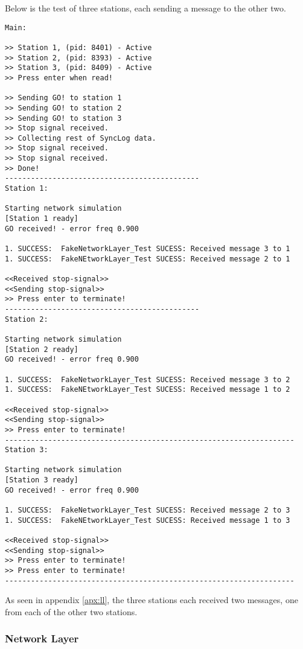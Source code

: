 Below is the test of three stations, each sending a message to the other two.
\begin{lstlisting}
Main:

>> Station 1, (pid: 8401) - Active
>> Station 2, (pid: 8393) - Active
>> Station 3, (pid: 8409) - Active
>> Press enter when read!

>> Sending GO! to station 1
>> Sending GO! to station 2
>> Sending GO! to station 3
>> Stop signal received.
>> Collecting rest of SyncLog data.
>> Stop signal received.
>> Stop signal received.
>> Done!
---------------------------------------------
Station 1:

Starting network simulation
[Station 1 ready]
GO received! - error freq 0.900

1. SUCCESS:  FakeNetworkLayer_Test SUCESS: Received message 3 to 1
1. SUCCESS:  FakeNEtworkLayer_Test SUCESS: Received message 2 to 1

<<Received stop-signal>>
<<Sending stop-signal>>
>> Press enter to terminate!
---------------------------------------------
Station 2:

Starting network simulation
[Station 2 ready]
GO received! - error freq 0.900

1. SUCCESS:  FakeNetworkLayer_Test SUCESS: Received message 3 to 2
1. SUCCESS:  FakeNEtworkLayer_Test SUCESS: Received message 1 to 2

<<Received stop-signal>>
<<Sending stop-signal>>
>> Press enter to terminate!
-------------------------------------------------------------------
Station 3:

Starting network simulation
[Station 3 ready]
GO received! - error freq 0.900

1. SUCCESS:  FakeNetworkLayer_Test SUCESS: Received message 2 to 3
1. SUCCESS:  FakeNEtworkLayer_Test SUCESS: Received message 1 to 3

<<Received stop-signal>>
<<Sending stop-signal>>
>> Press enter to terminate!
>> Press enter to terminate!
-------------------------------------------------------------------
\end{lstlisting}

As seen in appendix \ref{apx:ll}, the three stations each received two messages, one from each of the other two stations.



\subsubsection{Network Layer}

